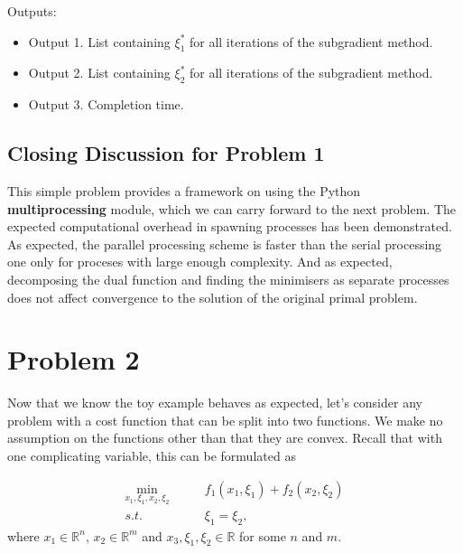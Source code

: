\documentclass[12pt]{article}
\begin{document}
Outputs:
\begin{itemize}
	\item Output 1. List containing $\xi_1^*$ for all iterations of the subgradient method.
	\item Output 2. List containing $\xi_2^*$ for all iterations of the subgradient method.
	\item Output 3. Completion time.
\end{itemize}

\subsection*{Closing Discussion for Problem 1}

This simple problem provides a framework on using the Python \textbf{multiprocessing} module, which we can carry forward to the next problem. The expected computational overhead in spawning processes has been demonstrated. As expected, the parallel processing scheme is faster than the serial processing one only for proceses with large enough complexity. And as expected, decomposing the dual function and finding the minimisers as separate processes does not affect convergence to the solution of the original primal problem.

\section*{Problem 2}

Now that we know the toy example behaves as expected, let's consider any problem with a cost function that can be split into two functions. We make no assumption on the functions other than that they are convex. Recall that with one complicating variable, this can be formulated as

\begin{align*}
\min_{x_1,\xi_1,x_2,\xi_2}\qquad&f_1(x_1,\xi_1)+f_2(x_2,\xi_2)\\
s.t.\qquad&\xi_1=\xi_2,
\end{align*}
where $x_1\in\mathbb{R}^n$, $x_2\in\mathbb{R}^m$ and $x_3,\xi_1,\xi_2\in\mathbb{R}$ for some $n$ and $m$.
\end{document}
